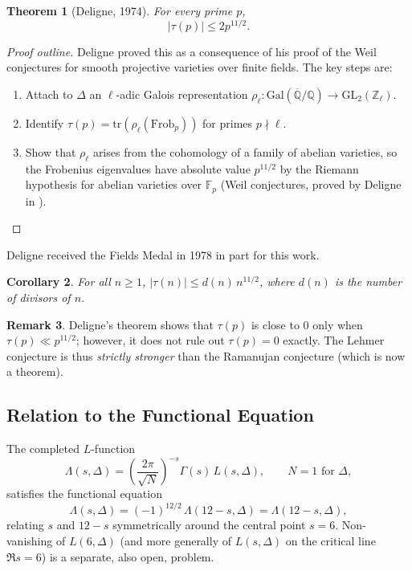 \documentclass[12pt,a4paper]{amsart}
\newtheorem{theorem}{Theorem}[section]
\newtheorem{corollary}[theorem]{Corollary}
\theoremstyle{definition}
\newtheorem{remark}[theorem]{Remark}
\begin{document}
\begin{theorem}[Deligne, 1974]\label{thm:deligne}
  For every prime $p$,
  \[
    |\tau(p)| \leq 2p^{11/2}.
  \]
\end{theorem}

\begin{proof}[Proof outline]
  Deligne \cite{Deligne1974} proved this as a consequence of his proof of the Weil
  conjectures for smooth projective varieties over finite fields. The key steps are:
  \begin{enumerate}[label=(\roman*)]
    \item Attach to $\Delta$ an $\ell$-adic Galois representation
          $\rho_\ell : \mathrm{Gal}(\overline{\mathbb{Q}}/\mathbb{Q}) \to
          \mathrm{GL}_2(\mathbb{Z}_\ell)$.
    \item Identify $\tau(p) = \mathrm{tr}(\rho_\ell(\mathrm{Frob}_p))$ for
          primes $p \nmid \ell$.
    \item Show that $\rho_\ell$ arises from the cohomology of a family of
          abelian varieties, so the Frobenius eigenvalues have absolute value
          $p^{11/2}$ by the Riemann hypothesis for abelian varieties over
          $\mathbb{F}_p$ (Weil conjectures, proved by Deligne in
          \cite{DelignePureI}).
  \end{enumerate}
\end{proof}

Deligne received the Fields Medal in 1978 in part for this work.

\begin{corollary}\label{cor:deligne-coeff}
  For all $n \geq 1$, $|\tau(n)| \leq d(n)\, n^{11/2}$, where $d(n)$ is the
  number of divisors of $n$.
\end{corollary}

\begin{remark}
  Deligne's theorem shows that $\tau(p)$ is close to $0$ only when
  $\tau(p) \ll p^{11/2}$; however, it does not rule out $\tau(p) = 0$ exactly.
  The Lehmer conjecture is thus \emph{strictly stronger} than the Ramanujan
  conjecture (which is now a theorem).
\end{remark}

\subsection{Relation to the Functional Equation}

The completed $L$-function
\[
  \Lambda(s, \Delta) = \left(\frac{2\pi}{\sqrt{N}}\right)^{-s}
  \Gamma(s)\, L(s, \Delta), \qquad N = 1 \text{ for } \Delta,
\]
satisfies the functional equation
\[
  \Lambda(s, \Delta) = (-1)^{12/2}\, \Lambda(12-s, \Delta)
  = \Lambda(12-s, \Delta),
\]
relating $s$ and $12-s$ symmetrically around the central point $s = 6$.
Non-vanishing of $L(6, \Delta)$ (and more generally of $L(s, \Delta)$ on the
critical line $\Re s = 6$) is a separate, also open, problem.
\end{document}
